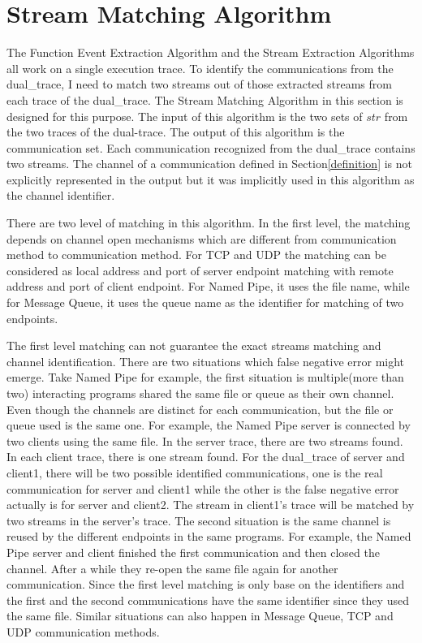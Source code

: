 \section{Stream Matching Algorithm}\label{streammatch}
The Function Event Extraction Algorithm and the Stream Extraction Algorithms all work on a single execution trace. To identify the communications from the dual\_trace, I need to match two streams out of those extracted streams from each trace of the dual\_trace. The Stream Matching Algorithm in this section is designed for this purpose. The input of this algorithm is the two sets of $str$ from the two traces of the dual-trace. The output of this algorithm is the communication set. Each communication recognized from the dual\_trace contains two streams. The channel of a communication defined in Section\ref{definition} is not explicitly represented in the output but it was implicitly used in this algorithm as the channel identifier. 

There are two level of matching in this algorithm. In the first level, the matching depends on channel open mechanisms which are different from communication method to communication method. For TCP and UDP the matching can be considered as local address and port of server endpoint matching with remote address and port of client endpoint. For Named Pipe, it uses the file name, while for Message Queue, it uses the queue name as the identifier for matching of two endpoints. 

The first level matching can not guarantee the exact streams matching and channel identification. There are two situations which false negative error might emerge. Take Named Pipe for example, the first situation is multiple(more than two) interacting programs shared the same file or queue as their own channel. Even though the channels are distinct for each communication, but the file or queue used is the same one. For example, the Named Pipe server is connected by two clients using the same file. In the server trace, there are two streams found. In each client trace, there is one stream found. For the dual\_trace of server and client1, there will be two possible identified communications, one is the real communication for server and client1 while the other is the false negative error actually is for server and client2. The stream in client1's trace will be matched by two streams in the server's trace. The second situation is the same channel is reused by the different endpoints in the same programs. For example, the Named Pipe server and client finished the first communication and then closed the channel. After a while they re-open the same file again for another communication. Since the first level matching is only base on the identifiers and the first and the second communications have the same identifier since they used the same file. Similar situations can also happen in Message Queue, TCP and UDP communication methods. 

